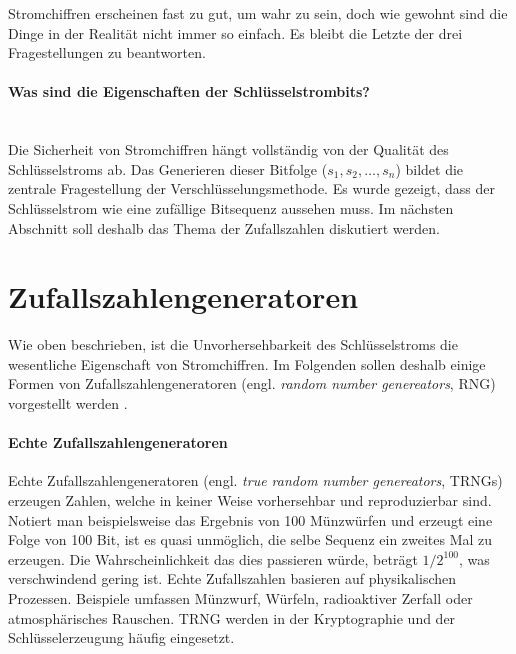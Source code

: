 \noindent
Stromchiffren erscheinen fast zu gut, um wahr zu sein, doch wie gewohnt sind die Dinge in
der Realität nicht immer so einfach. Es bleibt die Letzte der drei Fragestellungen zu
beantworten.
\newpage

\paragraph{Was sind die Eigenschaften der Schlüsselstrombits?}\mbox{}\\
Die Sicherheit von Stromchiffren hängt vollständig von der Qualität des Schlüsselstroms ab.
Das Generieren dieser Bitfolge ($s_1,s_2,\dots,s_n$) bildet die zentrale Fragestellung
der Verschlüsselungsmethode.
Es wurde gezeigt, dass der Schlüsselstrom wie eine zufällige
Bitsequenz aussehen muss. Im nächsten Abschnitt soll deshalb das Thema der
Zufallszahlen diskutiert werden.

\section{Zufallszahlengeneratoren}
Wie oben beschrieben, ist die Unvorhersehbarkeit des Schlüsselstroms die wesentliche
Eigenschaft von Stromchiffren. Im Folgenden sollen deshalb einige
Formen von Zufallszahlengeneratoren (engl. \textit{random number genereators}, RNG) vorgestellt
werden \parencite[35-36]{BOOK:crypto} \parencite{SITE:randomorg}.

\paragraph{Echte Zufallszahlengeneratoren}
Echte Zufallszahlengeneratoren (engl. \textit{true random number genereators}, TRNGs)
erzeugen Zahlen, welche in keiner Weise vorhersehbar und reproduzierbar sind. Notiert man
beispielsweise das Ergebnis von 100 Münzwürfen und erzeugt eine Folge von 100 Bit, ist es quasi
unmöglich, die selbe Sequenz ein zweites Mal zu erzeugen. Die Wahrscheinlichkeit
das dies passieren würde, beträgt $1/2^{100}$, was verschwindend gering ist.
Echte Zufallszahlen basieren auf physikalischen Prozessen. Beispiele umfassen Münzwurf, Würfeln,
radioaktiver Zerfall oder atmosphärisches Rauschen. TRNG werden in der Kryptographie und
der Schlüsselerzeugung häufig eingesetzt.

